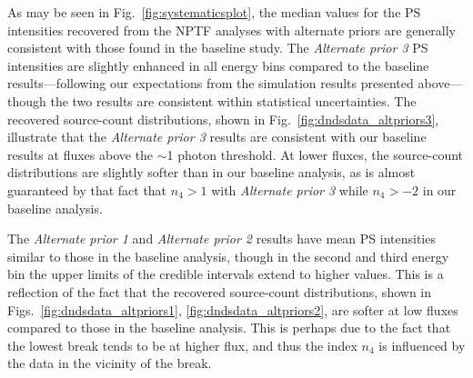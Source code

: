 As may be seen in Fig.~\ref{fig:systematicsplot}, the median values for the PS intensities recovered from the NPTF analyses with alternate priors are generally consistent with those found in the baseline study.  The {\it Alternate prior 3} PS intensities are slightly enhanced in all energy bins compared to the baseline results---following our expectations from the simulation results presented above---though the two results are consistent within statistical uncertainties.  The recovered source-count distributions, shown in Fig.~\ref{fig:dndsdata_altpriors3}, illustrate that the {\it Alternate prior 3} results are consistent with our baseline results at fluxes above the $\sim$1 photon threshold.  At lower fluxes, the source-count distributions are slightly softer than in our baseline analysis, as is almost guaranteed by that fact that $n_4 > 1$ with {\it Alternate prior 3} while $n_4 > -2$ in our baseline analysis.   

The {\it Alternate prior 1} and {\it Alternate prior 2} results have mean PS intensities similar to those in the baseline analysis, though in the second and third energy bin the upper limits of the credible intervals extend to higher values.  This is a reflection of the fact that the recovered source-count distributions, shown in Figs.~\ref{fig:dndsdata_altpriors1}, \ref{fig:dndsdata_altpriors2}, are softer at low fluxes compared to those in the baseline analysis.  This is perhaps due to the fact that the lowest break tends to be at higher flux, and thus the index $n_4$ is influenced by the data in the vicinity of the break.  

